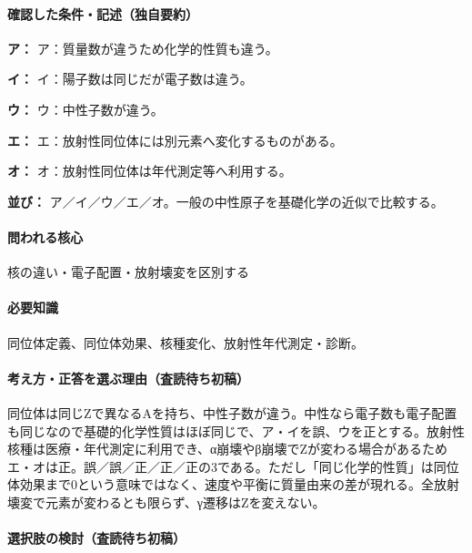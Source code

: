 \paragraph{確認した条件・記述（独自要約）}\mbox{}\par

\noindent\textbf{ア：} ア：質量数が違うため化学的性質も違う。\par

\noindent\textbf{イ：} イ：陽子数は同じだが電子数は違う。\par

\noindent\textbf{ウ：} ウ：中性子数が違う。\par

\noindent\textbf{エ：} エ：放射性同位体には別元素へ変化するものがある。\par

\noindent\textbf{オ：} オ：放射性同位体は年代測定等へ利用する。\par

\noindent\textbf{並び：} ア／イ／ウ／エ／オ。一般の中性原子を基礎化学の近似で比較する。\par

\paragraph{問われる核心} 核の違い・電子配置・放射壊変を区別する

\paragraph{必要知識} 同位体定義、同位体効果、核種変化、放射性年代測定・診断。

\paragraph{考え方・正答を選ぶ理由（査読待ち初稿）} 同位体は同じZで異なるAを持ち、中性子数が違う。中性なら電子数も電子配置も同じなので基礎的化学性質はほぼ同じで、ア・イを誤、ウを正とする。放射性核種は医療・年代測定に利用でき、α崩壊やβ崩壊でZが変わる場合があるためエ・オは正。誤／誤／正／正／正の3である。ただし「同じ化学的性質」は同位体効果まで0という意味ではなく、速度や平衡に質量由来の差が現れる。全放射壊変で元素が変わるとも限らず、γ遷移はZを変えない。

\paragraph{選択肢の検討（査読待ち初稿）}\mbox{}\par

